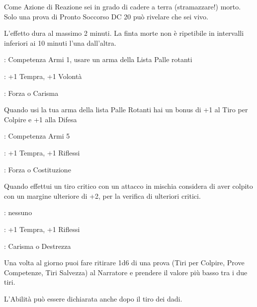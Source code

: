 \begin{multicols}{2}
Come Azione di Reazione sei in grado di cadere a terra (stramazzare!) morto. Solo una prova di Pronto Soccorso DC 20 può rivelare che sei vivo.

L'effetto dura al massimo 2 minuti. La finta morte non è ripetibile in intervalli inferiori ai 10 minuti l'una dall'altra.

\begin{description}[noitemsep, topsep=0pt, parsep=0pt, partopsep=0pt, leftmargin=0cm, labelwidth=2.5cm]
    \item[\textbf{Requisito}]: Competenza Armi 1, usare un arma della Lista Palle rotanti
    \item[\textbf{Tiri Salvezza}]: +1 Tempra, +1 Volontà
    \item[\textbf{Caratteristica}]: Forza o Carisma
\end{description}

Quando usi la tua arma della lista Palle Rotanti hai un bonus di +1 al Tiro per Colpire e +1 alla Difesa

\begin{description}[noitemsep, topsep=0pt, parsep=0pt, partopsep=0pt, leftmargin=0cm, labelwidth=2.5cm]
    \item[\textbf{Requisito}]: Competenza Armi 5
    \item[\textbf{Tiri Salvezza}]: +1 Tempra, +1 Riflessi
    \item[\textbf{Caratteristica}]: Forza o Costituzione
\end{description}

Quando effettui un tiro critico con un attacco in mischia considera di aver colpito con un margine ulteriore di +2, per la verifica di ulteriori critici.

\begin{description}[noitemsep, topsep=0pt, parsep=0pt, partopsep=0pt, leftmargin=0cm, labelwidth=2.5cm]
    \item[\textbf{Requisito}]: nessuno
    \item[\textbf{Tiri Salvezza}]: +1 Tempra, +1 Riflessi
    \item[\textbf{Caratteristica}]: Carisma o Destrezza
\end{description}

Una volta al giorno puoi fare ritirare 1d6 di una prova (Tiri per Colpire, Prove Competenze, Tiri Salvezza) al Narratore e prendere il valore più basso tra i due tiri.

L'Abilità può essere dichiarata anche dopo il tiro dei dadi.


\end{multicols}

